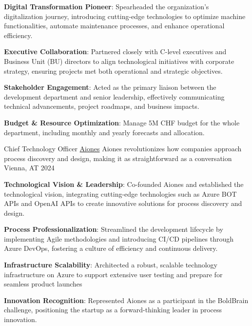 \begin{cventries}
{\begin{cvitems}
            \item {\textbf{Digital Transformation Pioneer}: Spearheaded the organization’s digitalization journey, introducing cutting-edge technologies to optimize machine functionalities, automate maintenance processes, and enhance operational efficiency.}
            \item {\textbf{Executive Collaboration}: Partnered closely with C-level executives and Business Unit (BU) directors to align technological initiatives with corporate strategy, ensuring projects met both operational and strategic objectives.}
            \item {\textbf{Stakeholder Engagement}: Acted as the primary liaison between the development department and senior leadership, effectively communicating technical advancements, project roadmaps, and business impacts.}
            \item {\textbf{Budget \& Resource Optimization}: Manage 5M CHF budget for the whole department, including monthly and yearly forecasts and allocation.}
        \end{cvitems}
    }
  \cventry
  {Chief Technology Officer} %
  {\href{https://www.aiones.ai}{Aiones}} %
  {Aiones revolutionizes how companies approach process discovery and design, making it as straightforward as a conversation} %
  {Vienna, AT} %
  {2024} %
  {
    \begin{cvitems} %
      \item {\textbf{Technological Vision \& Leadership}: Co-founded Aiones and established the technological vision, integrating cutting-edge technologies such as Azure BOT APIs and OpenAI APIs to create innovative solutions for process discovery and design.}
      \item {\textbf{Process Professionalization}: Streamlined the development lifecycle by implementing Agile methodologies and introducing CI/CD pipelines through Azure DevOps, fostering a culture of efficiency and continuous delivery.}
      \item {\textbf{Infrastructure Scalability}: Architected a robust, scalable technology infrastructure on Azure to support extensive user testing and prepare for seamless product launches}
      \item {\textbf{Innovation Recognition}: Represented Aiones as a participant in the BoldBrain challenge, positioning the startup as a forward-thinking leader in process innovation.}
    \end{cvitems}
}
\end{cventries}
